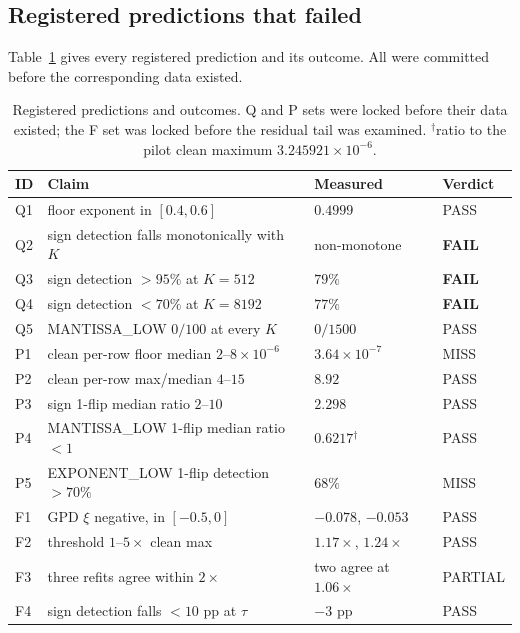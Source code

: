 \documentclass[11pt]{article}
\begin{document}
\subsection{Registered predictions that failed}
\label{sec:results:predictions}

Table~\ref{tab:scorecard} gives every registered prediction and its outcome.
All were committed before the corresponding data existed.

\begin{table}[t]
\centering
\begin{tabular}{llll}
\toprule
ID & Claim & Measured & Verdict \\
\midrule
Q1 & floor exponent in $[0.4, 0.6]$ & $0.4999$ & PASS \\
Q2 & sign detection falls monotonically with $K$ & non-monotone & \textbf{FAIL} \\
Q3 & sign detection $> 95\%$ at $K = 512$ & $79\%$ & \textbf{FAIL} \\
Q4 & sign detection $< 70\%$ at $K = 8192$ & $77\%$ & \textbf{FAIL} \\
Q5 & MANTISSA\_LOW $0/100$ at every $K$ & $0/1500$ & PASS \\
\midrule
P1 & clean per-row floor median $2$--$8 \times 10^{-6}$ & $3.64 \times 10^{-7}$ & MISS \\
P2 & clean per-row max/median $4$--$15$ & $8.92$ & PASS \\
P3 & sign 1-flip median ratio $2$--$10$ & $2.298$ & PASS \\
P4 & MANTISSA\_LOW 1-flip median ratio $< 1$ & $0.6217$$^{\dagger}$ & PASS \\
P5 & EXPONENT\_LOW 1-flip detection $> 70\%$ & $68\%$ & MISS \\
\midrule
F1 & GPD $\xi$ negative, in $[-0.5, 0]$ & $-0.078$, $-0.053$ & PASS \\
F2 & threshold $1$--$5\times$ clean max & $1.17\times$, $1.24\times$ & PASS \\
F3 & three refits agree within $2\times$ & two agree at $1.06\times$ & PARTIAL \\
F4 & sign detection falls $< 10$ pp at $\tau$ & $-3$ pp & PASS \\
\bottomrule
\end{tabular}
\caption{Registered predictions and outcomes. Q and P sets were locked before
their data existed; the F set was locked before the residual tail was examined.
$^{\dagger}$ratio to the pilot clean maximum $3.245921 \times 10^{-6}$.}
\label{tab:scorecard}
\end{table}
\end{document}

